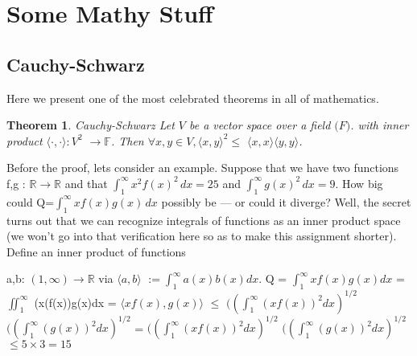 \documentclass[12pt]{article}
\newtheorem{theorem}{Theorem}
\begin{document}
\section{Some Mathy Stuff}
\subsection{Cauchy-Schwarz}
Here we present one of the most celebrated theorems in all of mathematics.

\begin{theorem}{Cauchy-Schwarz}
{Let $V$ be a vector space over a field $\mathbb(F)$. with inner product $\langle \cdot,\cdot\rangle : V^2$ $\rightarrow \mathbb{F}$. Then $\forall x,y \in{V}, \langle x,y \rangle^2 \le$ $\langle x,x\rangle \langle y,y\rangle$}.
\end{theorem}

\noindent Before the proof, lets consider an example. Suppose that we have two functions f,g : $\mathbb{R} \rightarrow \mathbb{R}$ and that \(\int_{1}^{\infty} x^2 f(x)^2\,dx=25\) and \(\int_{1}^{\infty}g(x)^2\,dx=9\). How big could Q=\(\int_{1}^{\infty} xf(x)g(x)\,dx\) possibly be --- or could it diverge?
\newline
\newline
Well, the secret turns out that we can recognize integrals of functions as an inner product space (we won’t go into that verification here so as to make this assignment shorter). Define an inner product of functions

\newpage


a,b: $(1,\infty) \rightarrow \mathbb{R}$ via $\langle a,b\rangle$ $:= \int_{1}^{\infty}a(x)b(x)dx.$
\newline
\newline
Q = $\int_{1}^{\infty} xf(x)g(x)dx$
\newline
\newline
= $\iint_{1}^{\infty}$ (x(f(x))g(x)dx
\newline
\newline
= $\langle xf(x),g(x) \rangle$
\newline
\newline
$\le$ $((\int_{1}^{\infty}(xf(x))^{2}dx)^{1/2}$ $((\int_{1}^{\infty}(g(x))^{2}dx)^{1/2}$
\newline 
\newline
= $((\int_{1}^{\infty}(xf(x))^{2}dx)^{1/2}$ $((\int_{1}^{\infty}(g(x))^{2}dx)^{1/2}$
\newline
\newline
$\le 5\times 3 = 15$
\end{document}
